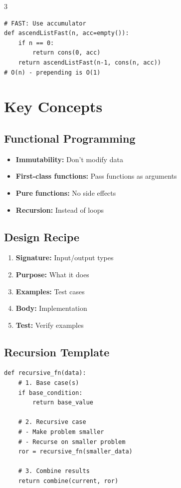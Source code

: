 \documentclass[8pt,landscape,a4paper]{article}
\begin{document}
\begin{multicols}{3}
\begin{lstlisting}
# FAST: Use accumulator
def ascendListFast(n, acc=empty()):
    if n == 0:
        return cons(0, acc)
    return ascendListFast(n-1, cons(n, acc))
# O(n) - prepending is O(1)
\end{lstlisting}

\section*{Key Concepts}

\subsection*{Functional Programming}
\begin{itemize}[itemsep=0pt]
    \item \textbf{Immutability:} Don't modify data
    \item \textbf{First-class functions:} Pass functions as arguments
    \item \textbf{Pure functions:} No side effects
    \item \textbf{Recursion:} Instead of loops
\end{itemize}

\subsection*{Design Recipe}
\begin{enumerate}[itemsep=0pt]
    \item \textbf{Signature:} Input/output types
    \item \textbf{Purpose:} What it does
    \item \textbf{Examples:} Test cases
    \item \textbf{Body:} Implementation
    \item \textbf{Test:} Verify examples
\end{enumerate}

\subsection*{Recursion Template}
\begin{lstlisting}
def recursive_fn(data):
    # 1. Base case(s)
    if base_condition:
        return base_value
    
    # 2. Recursive case
    # - Make problem smaller
    # - Recurse on smaller problem
    ror = recursive_fn(smaller_data)
    
    # 3. Combine results
    return combine(current, ror)
\end{lstlisting}

\end{multicols}
\end{document}
